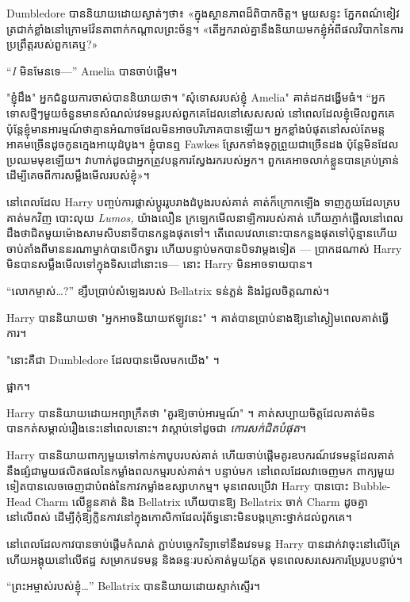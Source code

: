 {{{Dumbledore បាន​និយាយ​ដោយ​ស្ងាត់ៗ​ថា​៖ «​ក្នុង​ស្ថានភាព​ដ៏​ពិបាក​ចិត្ត​។ មួយសន្ទុះ ភ្នែកពណ៌ខៀវត្រជាក់ខ្លាំងនៅក្រោមវ៉ែនតាពាក់កណ្តាលព្រះច័ន្ទ។ «តើ​អ្នក​រាល់​គ្នា​នឹង​និយាយ​មក​ខ្ញុំ​អំពី​ផល​វិបាក​នៃ​ការ​ប្រព្រឹត្ត​របស់​ពួក​គេ​ឬ?»

“\emph{I} មិនមែនទេ—” Amelia បានចាប់ផ្តើម។

"ខ្ញុំដឹង" អ្នកជំនួយការចាស់បាននិយាយថា។ "សុំទោសរបស់ខ្ញុំ Amelia" គាត់ដកដង្ហើមធំ។ “អ្នកទោសថ្មីៗមួយចំនួនមានសំណល់វេទមន្តរបស់ពួកគេដែលនៅសេសសល់ នៅពេលដែលខ្ញុំមើលពួកគេ ប៉ុន្តែខ្ញុំមានអារម្មណ៍ថាគ្មានអំណាចដែលមិនអាចបរិភោគបានឡើយ។ អ្នកខ្លាំងបំផុតនៅសល់តែមន្តអាគមច្រើនដូចកូនក្មេងអាយុដំបូង។ ខ្ញុំ​បាន​ឮ Fawkes ស្រែក​ទាំង​ទុក្ខ​ព្រួយ​ជា​ច្រើន​ដង ប៉ុន្តែ​មិន​ដែល​ប្រឈម​មុខ​ឡើយ។ វាហាក់ដូចជាអ្នកត្រូវបន្តការស្វែងរករបស់អ្នក។ ពួក​គេ​អាច​លាក់​ខ្លួន​បាន​គ្រប់គ្រាន់​ដើម្បី​គេច​ពី​ការ​សម្លឹង​មើល​របស់​ខ្ញុំ»។

\later

នៅពេលដែល Harry បញ្ចប់ការផ្លាស់ប្តូររូបរាងដំបូងរបស់គាត់ គាត់ក៏ក្រោកឡើង ទាញភួយដែលគ្របគាត់មកវិញ បោះលុយ \emph{Lumos,} យ៉ាងលឿន ក្រឡេកមើលនាឡិការបស់គាត់ ហើយភ្ញាក់ផ្អើលនៅពេលដឹងថាជិតមួយម៉ោងសាមសិបនាទីបានកន្លងផុតទៅ។ តើពេលវេលានោះបានកន្លងផុតទៅប៉ុន្មានហើយ ចាប់តាំងពីមាននរណាម្នាក់បានបើកទ្វារ ហើយបន្ទាប់មកបានបិទវាម្តងទៀត — ប្រាកដណាស់ Harry មិនបានសម្លឹងមើលទៅក្នុងទិសដៅនោះទេ— នោះ Harry មិនអាចទាយបាន។

“លោកម្ចាស់…?” ខ្សឹបប្រាប់សំឡេងរបស់ Bellatrix ទន់ភ្លន់ និងរំជួលចិត្តណាស់។

Harry បាននិយាយថា "អ្នកអាចនិយាយឥឡូវនេះ" ។ គាត់បានប្រាប់នាងឱ្យនៅស្ងៀមពេលគាត់ធ្វើការ។

"នោះគឺជា Dumbledore ដែលបានមើលមកយើង" ។

ផ្អាក។

Harry បាននិយាយដោយអព្យាក្រឹតថា "គួរឱ្យចាប់អារម្មណ៍" ។ គាត់សប្បាយចិត្តដែលគាត់មិនបានកត់សម្គាល់រឿងនេះនៅពេលនោះ។ វាស្តាប់ទៅដូចជា \emph{ កោរសក់ជិតបំផុត}។

Harry បាននិយាយពាក្យមួយទៅកាន់កាបូបរបស់គាត់ ហើយចាប់ផ្តើមគូរឧបករណ៍វេទមន្តដែលគាត់នឹងផ្សំជាមួយផលិតផលនៃកម្លាំងពលកម្មរបស់គាត់។ បន្ទាប់មក នៅពេលដែលវាចេញមក ពាក្យមួយទៀតបានលេចចេញជាបំពង់នៃកាវកម្លាំងឧស្សាហកម្ម។ មុនពេលប្រើវា Harry បានបោះ Bubble-Head Charm លើខ្លួនគាត់ និង Bellatrix ហើយបានឱ្យ Bellatrix ចាក់ Charm ដូចគ្នានៅលើពស់ ដើម្បីកុំឱ្យក្លិនកាវនៅក្នុងកោសិកាដែលរុំព័ទ្ធនោះមិនបង្កគ្រោះថ្នាក់ដល់ពួកគេ។

នៅពេលដែលកាវបានចាប់ផ្តើមកំណត់ ភ្ជាប់បច្ចេកវិទ្យាទៅនឹងវេទមន្ត Harry បានដាក់វាចុះនៅលើគ្រែ ហើយអង្គុយនៅលើឥដ្ឋ សម្រាកវេទមន្ត និងឆន្ទៈរបស់គាត់មួយភ្លែត មុនពេលសរសេរការប្រែរូបបន្ទាប់។

“ព្រះអម្ចាស់របស់ខ្ញុំ…” Bellatrix បាននិយាយដោយស្ទាក់ស្ទើរ។

}}}
